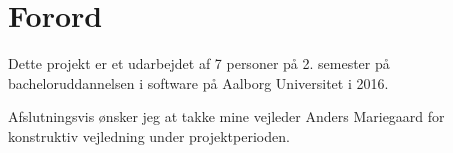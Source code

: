 \section{Forord}\label{Forord}

Dette projekt er et udarbejdet af 7 personer på 2. semester på bacheloruddannelsen i software på Aalborg Universitet i 2016.

\vspace{5mm}

Afslutningsvis ønsker jeg at takke mine vejleder Anders Mariegaard for konstruktiv
vejledning under projektperioden.